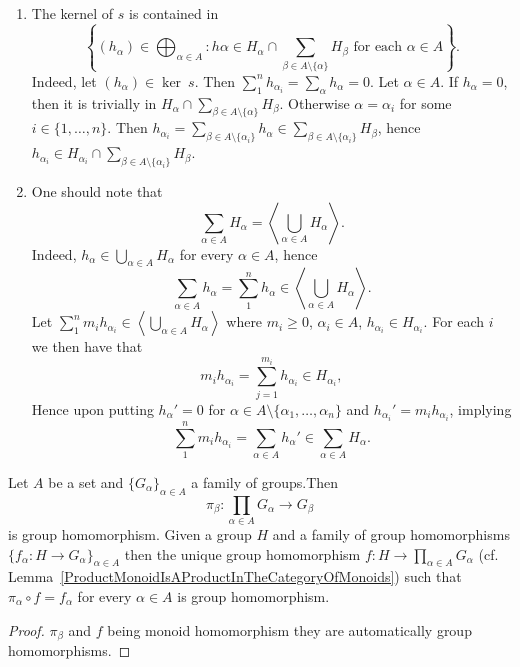 \begin{remark}\label{SumOfSubgroupsIsSubgroupGeneratedByUnion}
    \begin{enumerate}
    \item The kernel of $s$ is contained in 
    $$\left\{ (h_\alpha)\in \bigoplus_{\alpha\in A} : h\alpha \in H_\alpha \cap \sum_{\beta\in A\setminus\{\alpha\}} H_\beta \text{ for each } \alpha\in A\right\}.$$
    Indeed, let $(h_\alpha)\in \ker \ s$. Then $\sum_1^n h_{\alpha_i} = \sum_{\alpha} h_\alpha = 0$. Let $\alpha \in A$. If $h_\alpha =0$, then it is trivially in $H_\alpha \cap \sum_{\beta\in A\setminus\{\alpha\}} H_\beta$. Otherwise $\alpha = \alpha_i$ for some $i\in\{1,\dots,n\}$. Then $h_{\alpha_i}=\sum_{\beta\in A\setminus \{\alpha_i\}} h_\alpha \in \sum_{\beta\in A\setminus\{\alpha_i\}} H_\beta$, hence $h_{\alpha_i}\in H_{\alpha_i}\cap \sum_{\beta\in A\setminus\{\alpha_i\}} H_\beta$.
    \item One should note that $$\sum_{\alpha\in A} H_\alpha = \left\langle \bigcup_{\alpha\in A} H_\alpha \right\rangle.$$
    Indeed, $h_\alpha\in \bigcup_{\alpha\in A} H_\alpha$ for every $\alpha\in A$, hence 
    $$\sum_{\alpha\in A} h_\alpha = \sum_1^n h_\alpha \in \left\langle \bigcup_{\alpha\in A} H_\alpha \right\rangle.$$
    Let $\sum_1^n m_ih_{\alpha_i}\in \left\langle \bigcup_{\alpha\in A} H_\alpha \right\rangle$ where $m_i\geq 0$, $\alpha_i\in A$, $h_{\alpha_i}\in H_{\alpha_i}$. For each $i$ we then have that 
    $$m_ih_{\alpha_i} = \sum_{j=1}^{m_i} h_{\alpha_i}\in H_{\alpha_i},$$
    Hence upon putting $h_\alpha' = 0$ for $\alpha\in A\setminus\{\alpha_1,\dots,\alpha_n\}$ and $h_{\alpha_i}' = m_ih_{\alpha_i}$, implying 
    $$\sum_1^n m_ih_{\alpha_i} = \sum_{\alpha\in A} h_\alpha'\in \sum_{\alpha\in A} H_\alpha.$$
    \end{enumerate}
\end{remark}
\begin{proposition}\label{ProductGroupIsProductInCategoryOfGroups}
    Let $A$ be a set and $\{G_\alpha\}_{\alpha \in A}$ a family of groups.Then 
    $$\pi_\beta : \prod_{\alpha\in A} G_\alpha \rightarrow G_\beta$$
    is group homomorphism. Given a group $H$ and a family of group homomorphisms $\{f_\alpha : H\rightarrow G_\alpha\}_{\alpha\in A}$ then the unique group homomorphism $f: H\rightarrow \prod_{\alpha\in A} G_\alpha$ (cf. Lemma~\ref{ProductMonoidIsAProductInTheCategoryOfMonoids}) such that $\pi_\alpha \circ f = f_\alpha$ for every $\alpha \in A$ is group homomorphism. 
\end{proposition}
\begin{proof}
    $\pi_\beta$ and $f$ being monoid homomorphism they are automatically group homomorphisms.
\end{proof}

